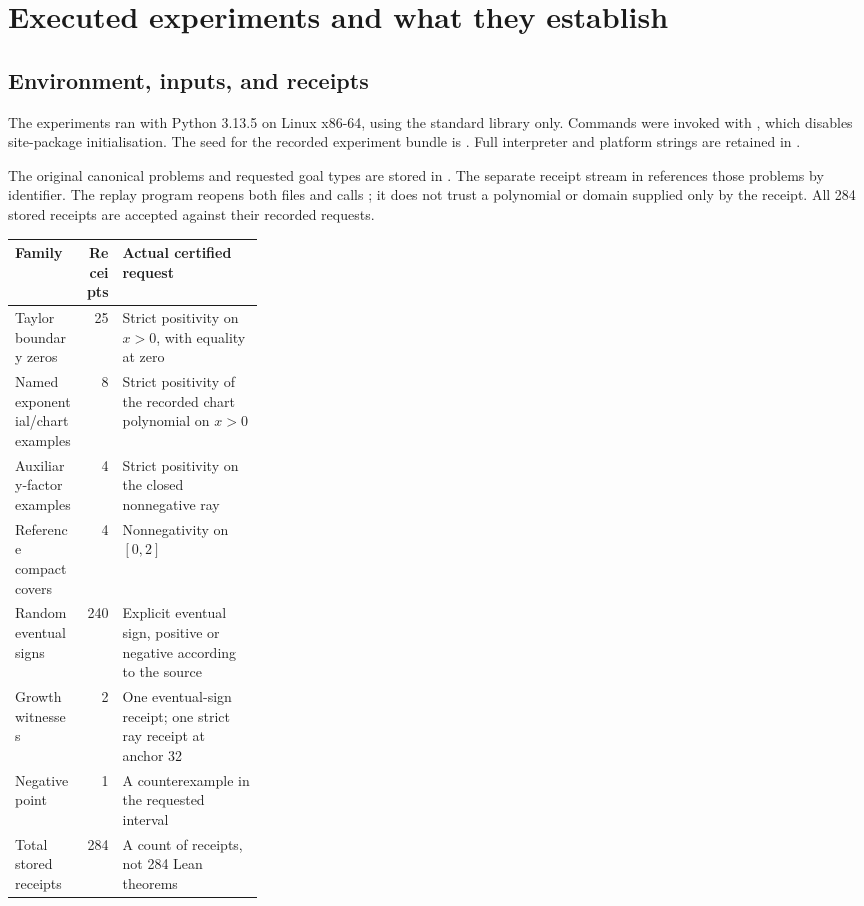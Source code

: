 \section{Executed experiments and what they establish}
\label{sec:experiments}

\subsection{Environment, inputs, and receipts}

The experiments ran with Python 3.13.5 on Linux x86-64, using the standard
library only. Commands were invoked with , which disables
site-package initialisation. The seed for the recorded experiment bundle is
. Full interpreter and platform strings are retained in
.

The original canonical problems and requested goal types are stored in
.
The separate receipt stream in
references those problems by identifier. The replay program reopens both files
and calls ; it does not trust a polynomial or domain supplied
only by the receipt. All 284 stored receipts are accepted against their recorded
requests.

\begin{center}
\begin{tabularx}{\linewidth}{@{}p{0.29\linewidth}rX@{}}
\toprule
Family & Receipts & Actual certified request\\
\midrule
Taylor boundary zeros & 25 & Strict positivity on $x>0$, with equality at zero\\
Named exponential/chart examples & 8 & Strict positivity of the recorded chart polynomial on $x>0$\\
Auxiliary-factor examples & 4 & Strict positivity on the closed nonnegative ray\\
Reference compact covers & 4 & Nonnegativity on $[0,2]$\\
Random eventual signs & 240 & Explicit eventual sign, positive or negative according to the source\\
Growth witnesses & 2 & One eventual-sign receipt; one strict ray receipt at anchor 32\\
Negative point & 1 & A counterexample in the requested interval\\
\midrule
Total stored receipts & 284 & A count of receipts, not 284 Lean theorems\\
\bottomrule
\end{tabularx}
\end{center}

